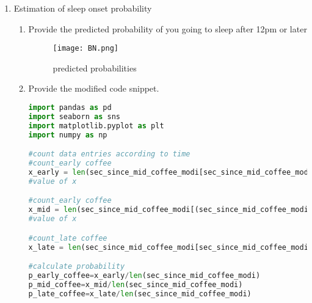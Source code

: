 \documentclass{homework}
\begin{document}
\begin{enumerate}
\begin{enumerate}[label=\alph*)]
		To be honest I can't draw any conclusion from this histogram other than that distribution is normal. Hence, we can conclude that result of simulations is adequate.
	\end{enumerate}
	\item  Estimation of sleep onset probability
	\begin{enumerate}[label=\alph*)]
		\item Provide the predicted probability of you going to sleep after 12pm or later
		\begin{figure}[hbt!]
			\centering
			\texttt{[image: BN.png]}
			\caption{predicted probabilities}
		\end{figure}
		\item  Provide the modified code snippet.
		\begin{lstlisting}[language=Python, caption=DT MC example 2, basicstyle=\tiny]
import pandas as pd
import seaborn as sns
import matplotlib.pyplot as plt
import numpy as np

#count data entries according to time
#count_early coffee
x_early = len(sec_since_mid_coffee_modi[sec_since_mid_coffee_modi < 12 * 60 * 60])# before oder at 12am
#value of x

#count_early coffee 
x_mid = len(sec_since_mid_coffee_modi[(sec_since_mid_coffee_modi >= 12 * 60 * 60) & (sec_since_mid_coffee_modi < 21 * 60 * 60)])# after 12am before 21pm
#value of x

#count_late coffee
x_late = len(sec_since_mid_coffee_modi[sec_since_mid_coffee_modi >= 21 * 60 * 60])

#calculate probability
p_early_coffee=x_early/len(sec_since_mid_coffee_modi)
p_mid_coffee=x_mid/len(sec_since_mid_coffee_modi)
p_late_coffee=x_late/len(sec_since_mid_coffee_modi)




\end{lstlisting}
\end{enumerate}
\end{enumerate}
\end{document}
